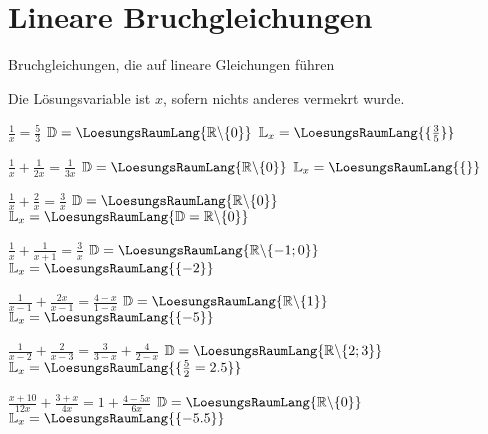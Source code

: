 

\renewcommand{\bbwAufgabenBlockID}{GL\_Br}



\usepackage{amssymb} %
\renewcommand{\metaHeaderLine}{Arbeitsblatt}
\renewcommand{\arbeitsblattTitel}{Bruchgleichungen}

\arbeitsblattHeader{}

\section{Lineare Bruchgleichungen}
Bruchgleichungen, die auf lineare Gleichungen führen

Die Lösungsvariable ist $x$, sofern nichts anderes vermekrt wurde.


\begin{bbwAufgabenBlock}
\item $\frac1x = \frac53$     \hspace{10mm}              $\mathbb{D}= \LoesungsRaumLang{\mathbb{R}\backslash\{0\}}$    $\mathbb{L}_x = \LoesungsRaumLang{\{\frac35\}}$
\item $\frac1x + \frac1{2x} = \frac1{3x}$ \hspace{10mm}   $\mathbb{D}= \LoesungsRaumLang{\mathbb{R}\backslash\{0\}}$    $\mathbb{L}_x = \LoesungsRaumLang{\{\}}$\noTRAINER{\newpage}
\item $\frac1x + \frac2x = \frac3x$  \hspace{10mm}       $\mathbb{D}= \LoesungsRaumLang{\mathbb{R}\backslash\{0\}}$    $\mathbb{L}_x = \LoesungsRaumLang{\mathbb{D}=\mathbb{R}\backslash\{0\}}$
\item $\frac1x + \frac1{x+1} = \frac3x$ \hspace{10mm}    $\mathbb{D}= \LoesungsRaumLang{\mathbb{R}\backslash\{-1;0\}}$ $\mathbb{L}_x = \LoesungsRaumLang{\{-2\}}$
\item $\frac1{x-1} + \frac{2x}{x-1} = \frac{4-x}{1-x}$ \hspace{10mm}    $\mathbb{D}= \LoesungsRaumLang{\mathbb{R}\backslash\{1\}}$ $\mathbb{L}_x = \LoesungsRaumLang{\{-5\}}$\noTRAINER{\newpage}
\item $\frac1{x-2} + \frac{2}{x-3} = \frac3{3-x} + \frac{4}{2-x}$ \hspace{10mm}    $\mathbb{D}= \LoesungsRaumLang{\mathbb{R}\backslash\{2;3\}}$ $\mathbb{L}_x = \LoesungsRaumLang{\{\frac{5}{2}=2.5\}}$
\item $\frac{x+10}{12x} + \frac{3+x}{4x} = 1 + \frac{4-5x}{6x}$ \hspace{10mm}    $\mathbb{D}= \LoesungsRaumLang{\mathbb{R}\backslash\{0\}}$ $\mathbb{L}_x = \LoesungsRaumLang{\{-5.5\}}$
\end{bbwAufgabenBlock}

